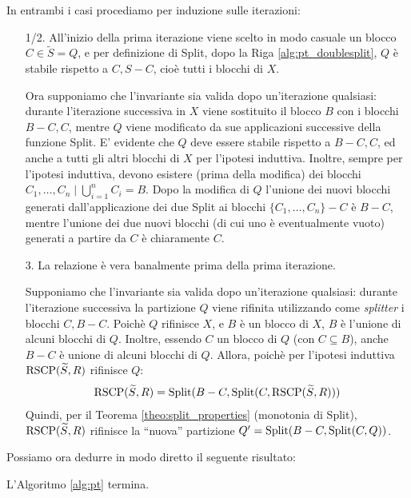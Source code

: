 \begin{proof2}
    In entrambi i casi procediamo per induzione sulle iterazioni:
    \begin{itemize}
        \item[1/2.] All'inizio della prima iterazione viene scelto in modo casuale un blocco $C \in \widetilde{S} = Q$, e per definizione di Split, dopo la Riga \ref{alg:pt_doublesplit}, $Q$ è stabile rispetto a $C, S-C$, cioè tutti i blocchi di $X$.

        Ora supponiamo che l'invariante sia valida dopo un'iterazione qualsiasi: durante l'iterazione successiva in $X$ viene sostituito il blocco $B$ con i blocchi $B-C, C$, mentre $Q$ viene modificato da sue applicazioni successive della funzione Split. E' evidente che $Q$ deve essere stabile rispetto a $B-C, C$, ed anche a tutti gli altri blocchi di $X$ per l'ipotesi induttiva. Inoltre, sempre per l'ipotesi induttiva, devono esistere (prima della modifica) dei blocchi $C_1, \dots, C_n \mid \bigcup_{i=1}^n C_i = B$. Dopo la modifica di $Q$ l'unione dei nuovi blocchi generati dall'applicazione dei due Split ai blocchi $\{C_1, \dots, C_n\} - C$ è $B-C$, mentre l'unione dei due nuovi blocchi (di cui uno è eventualmente vuoto) generati a partire da $C$ è chiaramente $C$.
        \item[3.] La relazione è vera banalmente prima della prima iterazione.

        Supponiamo che l'invariante sia valida dopo un'iterazione qualsiasi: durante l'iterazione successiva la
        partizione $Q$ viene rifinita utilizzando come \emph{splitter} i blocchi $C, B-C$. Poichè $Q$ rifinisce $X$, e $B$ è un blocco di $X$, $B$ è l'unione di alcuni blocchi di $Q$. Inoltre, essendo $C$ un blocco di $Q$ (con $C \subseteq B$), anche $B-C$ è unione di alcuni blocchi di $Q$. Allora, poichè per l'ipotesi induttiva $\textup{RSCP}(\widetilde{S},R)$ rifinisce $Q$:
        \begin{gather*}
            \textup{RSCP}(\widetilde{S},R) = \textup{Split}(B-C, \textup{Split}(C, \textup{RSCP}(\widetilde{S},R)))
        \end{gather*}
        Quindi, per il Teorema \ref{theo:split_properties} (monotonia di Split), $\textup{RSCP}(\widetilde{S},R)$ rifinisce la ``nuova'' partizione $Q' = \textup{Split}(B-C, \textup{Split}(C, Q))$.
    \end{itemize}
    \vspace*{-0.75cm}
\end{proof2}
Possiamo ora dedurre in modo diretto il seguente risultato:
\begin{corollary}
    L'Algoritmo \ref{alg:pt} termina.
\end{corollary}
